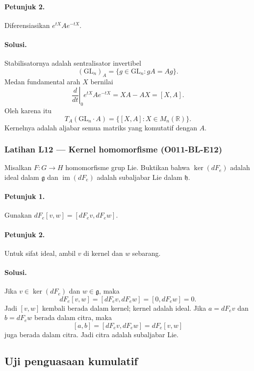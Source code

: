\paragraph{Petunjuk 2.}
Diferensiasikan $e^{tX}Ae^{-tX}$.

\paragraph{Solusi.}
Stabilisatornya adalah sentralisator invertibel
\[
 (\mathrm{GL}_n)_A=\{g\in\mathrm{GL}_n:gA=Ag\}.
\]
Medan fundamental arah $X$ bernilai
\[
 \left.\frac d{dt}\right|_0e^{tX}Ae^{-tX}=XA-AX=[X,A].
\]
Oleh karena itu
\[
 T_A(\mathrm{GL}_n\cdot A)=\{[X,A]:X\in M_n(\mathbb R)\}.
\]
Kernelnya adalah aljabar semua matriks yang komutatif dengan $A$.

\subsubsection*{Latihan L12 — Kernel homomorfisme (O011-BL-E12)}
\label{o011-bl-e12}

Misalkan $F\colon G\to H$ homomorfisme grup Lie. Buktikan bahwa
$\ker(dF_e)$ adalah ideal dalam $\mathfrak g$ dan
$\operatorname{im}(dF_e)$ adalah subaljabar Lie dalam $\mathfrak h$.

\paragraph{Petunjuk 1.}
Gunakan $dF_e[v,w]=[dF_ev,dF_ew]$.

\paragraph{Petunjuk 2.}
Untuk sifat ideal, ambil $v$ di kernel dan $w$ sebarang.

\paragraph{Solusi.}
Jika $v\in\ker(dF_e)$ dan $w\in\mathfrak g$, maka
\[
 dF_e[v,w]=[dF_ev,dF_ew]=[0,dF_ew]=0.
\]
Jadi $[v,w]$ kembali berada dalam kernel; kernel adalah ideal. Jika
$a=dF_ev$ dan $b=dF_ew$ berada dalam citra, maka
\[
 [a,b]=[dF_ev,dF_ew]=dF_e[v,w]
\]
juga berada dalam citra. Jadi citra adalah subaljabar Lie.

\subsection{Uji penguasaan kumulatif}


